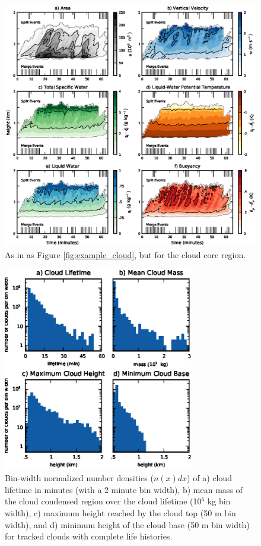 \documentclass[acp]{copernicus}
\begin{document}
\begin{figure}[t]
\vspace*{2mm}
\begin{center}
\includegraphics[width=\textwidth]{./figures/example_core}
\end{center}
\caption{As in as Figure \ref{fig:example_cloud}, but for the cloud core region.}
\label{fig:example_core}
\end{figure}

\begin{figure}[t]
\vspace*{2mm}
\begin{center}
\includegraphics[width=8.3cm]{./figures/cloud_stats}
\end{center}
\caption{Bin-width normalized number densities ($n(x)dx$) of a) cloud lifetime 
in minutes (with a 2 minute bin width), b) mean mass of the cloud condensed 
region over the cloud lifetime (10$^6$ kg bin width), c) maximum height reached 
by the cloud top (50 m bin width), and d) minimum height of the cloud base 
(50 m bin width) for tracked clouds with complete life histories.}
\label{fig:cloud_stats}
\end{figure}
\end{document}
